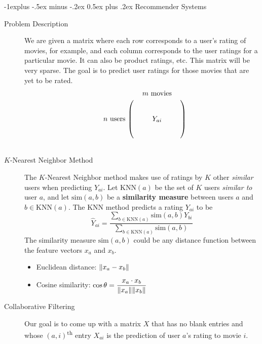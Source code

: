 \documentclass[10pt,landscape,a4paper]{article}
\makeatletter
\renewcommand{\subsection}{\@startsection{subsection}{2}{0mm}%
                                {-1explus -.5ex minus -.2ex}%
                                {0.5ex plus .2ex}%
                                {\normalfont\normalsize\bfseries}}
\makeatother
\begin{document}
\begin{multicols*}{3}
\subsection{Recommender Systems}

\begin{description}
	\item[Problem Description] We are given a matrix where each row corresponds to a user's rating of movies, for example, and each column corresponds to the user ratings for a particular movie. It can also be product ratings, etc. This matrix will be very sparse. The goal is to predict user ratings for those movies that are yet to be rated.
	\[
	\begin{blockarray}{cccc}
	& & m\text{ movies} \\
	\begin{block}{c(ccc)}
	 &  &  &  \\
	 &  &  &  \\
	n \text{ users}   &  & Y_{ai} & \\
	 &  &  & \\
	 &  &  & \\
	\end{block}
	\end{blockarray}
	\]
	\vspace*{-2em}
	\item[$K$-Nearest Neighbor Method] The $K$-Nearest Neighbor method makes use of ratings by $K$ other {\it similar} users when predicting $Y_{ai}.$ Let $\text{KNN}(a)$ be the set of $K$ users {\it similar to} user $a$, and let $\text{sim}(a,b)$ be a {\bf similarity measure} between users $a$ and $b\in\text{KNN}(a).$ The KNN method predicts a rating $Y_{ai}$ to be
	$$\widehat{Y}_{ai}=\dfrac{\sum\limits_{b\in\text{KNN}(a)}\text{sim}(a,b)Y_{bi}}{\sum\limits_{b\in\text{KNN}(a)}\text{sim}(a,b)}$$
	The similarity measure $\text{sim}(a,b)$ could be any distance function between the feature vectors $x_a$ and $x_b$.
	\begin{itemize}
		\item Euclidean distance: $\norm{x_a-x_b}$
		\item Cosine similarity: $\cos\theta=\dfrac{x_a\cdot x_b}{\norm{x_a}\norm{x_b}}$
	\end{itemize}
	\item[Collaborative Filtering] Our goal is to come up with a matrix $X$ that has no blank entries and whose $(a,i)$\textsuperscript{th} entry $X_{ai}$ is the prediction of user $a$'s rating to movie $i$.
	

\end{description}
\end{multicols*}
\end{document}
